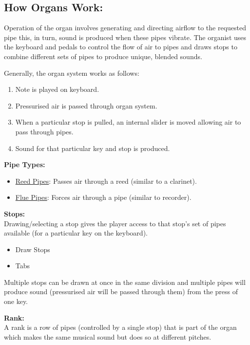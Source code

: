 \noindent \subsection{How Organs Work:}
\hspace{0.5cm} Operation of the organ involves generating and directing airflow to the requested pipe this, in turn, sound is produced when these pipes vibrate. The organist uses the keyboard and pedals to control the flow of air to pipes and draws stops to combine different sets of pipes to produce unique, blended sounds.  \cite{organvideo}

\noindent Generally, the organ system works as follows:
\begin{enumerate}
\item Note is played on keyboard.
\item Pressurised air is passed through organ system.
\item When a particular stop is pulled, an internal slider is moved allowing air to pass through pipes.
\item Sound for that particular key and stop is produced.
\end{enumerate}

\noindent \textbf{Pipe Types:}
\begin{itemize}
\item \underline{Reed Pipes}: Passes air through a reed (similar to a clarinet).
\item \underline{Flue Pipes}: Forces air through a pipe (similar to recorder).
\end{itemize}
\cite{organvideo}

\noindent \textbf{Stops:}
\\ \hspace*{0.5cm}Drawing/selecting a stop gives the player access to that stop's set of pipes available (for a particular key on the keyboard). 
\begin{itemize}
\item Draw Stops
\item Tabs
\end{itemize}

Multiple stops can be drawn at once in the same division and multiple pipes will produce sound (pressurised air will be passed through them) from the press of one key. \cite{organvideo}

\medskip
\noindent \textbf{Rank:}
\\ \hspace*{0.5cm} A rank is a row of pipes (controlled by a single stop) that is part of the organ which makes the same musical sound but does so at different pitches. 

